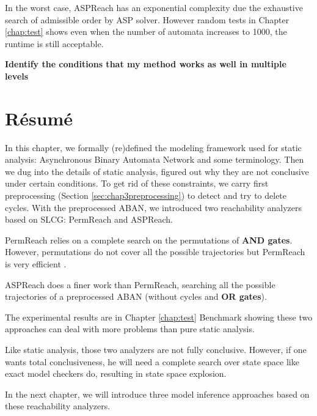 In the worst case, ASPReach has an exponential complexity due the exhaustive search of admissible order by ASP solver.
However random tests in Chapter \ref{chap:test} shows even when the number of automata increases to 1000, the runtime is still acceptable.

\textbf{Identify the conditions that my method works as well in multiple levels}

\section{R\'esum\'e}
In this chapter, we formally (re)defined the modeling framework used for static analysis: Asynchronous Binary Automata Network and some terminology.
Then we dug into the details of static analysis, figured out why they are not conclusive under certain conditions.
To get rid of these constraints, we carry first preprocessing (Section \ref{sec:chap3preprocessing}) to detect and try to delete cycles.
With the preprocessed ABAN, we introduced two reachability analyzers based on SLCG: PermReach and ASPReach.

PermReach relies on a complete search on the permutations of \textbf{AND gates}.
However, permutations do not cover all the possible trajectories but PermReach is very efficient .

ASPReach does a finer work than PermReach, searching all the possible trajectories of a preprocessed ABAN (without cycles and \textbf{OR gates}).

The experimental results are in Chapter \ref{chap:test} Benchmark showing these two approaches can deal with more problems than pure static analysis.

Like static analysis, those two analyzers are not fully conclusive.
However, if one wants total conclusiveness, he will need a complete search over state space like exact model checkers do, resulting in state space explosion.

In the next chapter, we will introduce three model inference approaches based on these reachability analyzers.